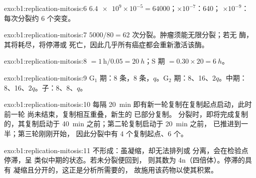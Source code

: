 \begin{solution}{exo:b1:replication-mitosis:6}
$\num{6.4e9}\times 10^{-5} = \num{64000}$；$\times 10^{-7}$：640；
$\times 10^{-9}$：每次分裂约 6 个突变。
\end{solution}

\begin{solution}{exo:b1:replication-mitosis:7}
$5000/80 = 62$ 次分裂。肿瘤须能无限分裂；若无
酶，其将耗尽，将停滞或
死亡，因此几乎所有癌症都会重新激活该酶。
\end{solution}

\begin{solution}{exo:b1:replication-mitosis:8}
 $= 1\,\mathrm{h}/0.05 = \qty{20}{h}$；S 期 $= 0.30\times 20 =
\qty{6}{h}$。
\end{solution}

\begin{solution}{exo:b1:replication-mitosis:9}
G$_1$ 期：8 条，8 条，$q$。G$_2$ 期：8、16、$2q$。中期：
8、16、$2q$。子：8、8、$q$。
\end{solution}

\begin{solution}{exo:b1:replication-mitosis:10}
每隔 \qty{20}{min} 即有新一轮复制在复制起点启动，此时前一轮
尚未结束，复制相互重叠，新生的  已部分复制。
分裂时，即将完成复制的，其复制启动于
\qty{40}{min} 之前；第二轮复制启动于 \qty{20}{min} 之前，
已推进到一半；第三轮刚刚开始，
因此分裂中有 4 个复制起点、6 个。
\end{solution}

\begin{solution}{exo:b1:replication-mitosis:11}
不形成：虽凝缩，却无法排列或
分离，会在检验点停滞，呈
类似中期的状态。若未分裂便回到，
则其数为 4n（四倍体）。停滞的具有
凝缩且分开的，这正是分析所需要的，
故施用该药物以使其积累。
\end{solution}

